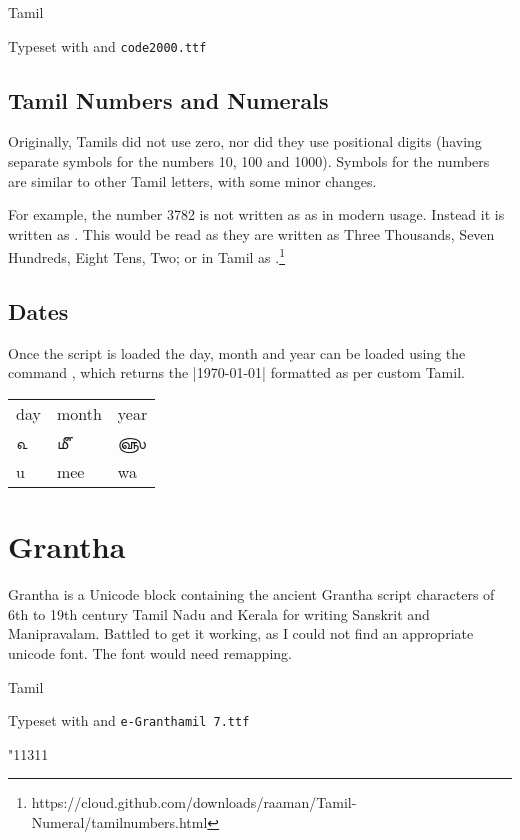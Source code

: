 \begin{scriptexample}[]{Tamil}

\hfill  Typeset with \cmd{\tamil} and \texttt{code2000.ttf}
\end{scriptexample}

\subsection{Tamil Numbers and Numerals}

Originally, Tamils did not use zero, nor did they use positional digits (having separate 
symbols for the numbers 10, 100 and 1000). Symbols for the numbers are similar to 
other Tamil letters, with some minor changes. 

For example, the number 3782 is not written as  as in modern usage. Instead it 
is written as . This would be read as they are written as 
Three Thousands, Seven Hundreds, Eight Tens, Two; or in Tamil as 
.\footnote{https://cloud.github.com/downloads/raaman/Tamil-Numeral/tamilnumbers.html}

\subsection{Dates}

Once the script is loaded the day, month and year can be loaded using the command  \cmd{\tamildate}, which returns the |\today| formatted as per custom Tamil. 

\begin{center}
\bgroup
\tamil
\begin{tabular}{lll}
day	 &month	&year	\\

௳	&௴	      &௵	\\

u	&mee	      &wa	\\
\end{tabular}
\egroup
\end{center}


\section{Grantha}
Grantha is a Unicode block containing the ancient Grantha script characters of 6th to 19th century Tamil Nadu and Kerala for writing Sanskrit and Manipravalam. Battled to get it working, as I could not find an appropriate unicode font. The font would need remapping.

\newfontfamily{}%

\begin{scriptexample}[]{Tamil}

\hfill  Typeset with \cmd{\grantha} and \texttt{e-Granthamil 7.ttf}
\end{scriptexample}

{
\grantha \char"11311

}


